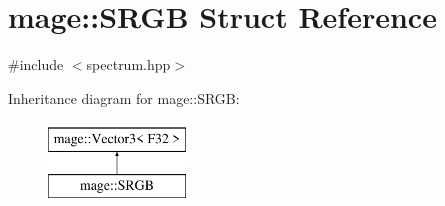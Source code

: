 \hypertarget{structmage_1_1_s_r_g_b}{}\section{mage\+:\+:S\+R\+GB Struct Reference}
\label{structmage_1_1_s_r_g_b}


{\ttfamily \#include $<$spectrum.\+hpp$>$}

Inheritance diagram for mage\+:\+:S\+R\+GB\+:\begin{figure}[H]
\begin{center}
\leavevmode
\includegraphics[height=2.000000cm]{structmage_1_1_s_r_g_b}
\end{center}
\end{figure}
